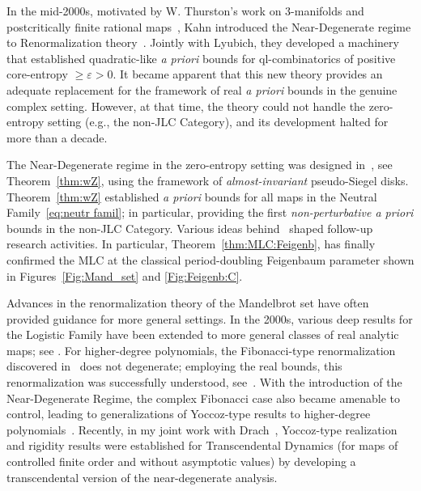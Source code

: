\documentclass[twoside,leqno]{article}
\theoremstyle{plain}
\begin{document}
In the mid-2000s, motivated by W. Thurston's work on $3$-manifolds and postcritically finite rational maps~\cite{BillTh, DH:Thurst}, Kahn introduced the Near-Degenerate regime to Renormalization theory~\cite{Kahn}. Jointly with Lyubich, they developed a machinery~\cite{KL09,KL2,KL3} that established quadratic-like \emph{a priori} bounds for ql-combinatorics of positive core-entropy $\ge \varepsilon >0$. It became apparent that this new theory provides an adequate replacement for the framework of real \emph{a priori} bounds in the genuine complex setting. However, at that time, the theory could not handle the zero-entropy setting (e.g., the non-JLC Category), and its development halted for more than a decade.




The Near-Degenerate regime in the zero-entropy setting was designed in~\cite{DL_Uniform}, see Theorem~\ref{thm:wZ}, using the framework of \emph{almost-invariant} pseudo-Siegel disks. Theorem~\ref{thm:wZ} established \emph{a priori} bounds for all maps in the Neutral Family~\eqref{eq:neutr famil}; in particular, providing the first \emph{non-perturbative a priori} bounds in the non-JLC Category. Various ideas behind~\cite{DL_Uniform} shaped follow-up research activities. In particular, Theorem~\ref{thm:MLC:Feigenb}, \cite{DLFeig} has finally confirmed the MLC at the classical period-doubling Feigenbaum parameter shown in Figures~\ref{Fig:Mand_set} and \ref{Fig:Feigenb:C}.



Advances in the renormalization theory of the Mandelbrot set have often provided guidance for more general settings. In the 2000s, various deep results for the Logistic Family have been extended to more general classes of real analytic maps; see \cite{ALdM, KSS,KSS-density}. For higher-degree polynomials, the Fibonacci-type renormalization discovered in~\cite{LM} does not degenerate; employing the real bounds, this renormalization was successfully understood, see~\cite{Sm2, Sm3}. With the introduction of the Near-Degenerate Regime, the complex Fibonacci case also became amenable to control, leading to generalizations of Yoccoz-type results to higher-degree polynomials~\cite{KLUnicr, AKLS}. Recently, in my joint work with Drach~\cite{DD}, Yoccoz-type realization and rigidity results were established for Transcendental Dynamics (for maps of controlled finite order and without asymptotic values) by developing a transcendental version of the near-degenerate analysis.
\end{document}
